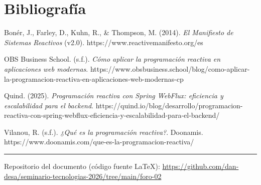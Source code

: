 \documentclass[
  spanish,
  12pt,
  letterpaper,
]{article}
\begin{document}
\section{Bibliografía}\label{bibliografuxeda}

Bonér, J., Farley, D., Kuhn, R., \& Thompson, M. (2014). \emph{El
Manifiesto de Sistemas Reactivos} (v2.0).
https://www.reactivemanifesto.org/es

OBS Business School. (s.f.). \emph{Cómo aplicar la programación reactiva
en aplicaciones web modernas}.
https://www.obsbusiness.school/blog/como-aplicar-la-programacion-reactiva-en-aplicaciones-web-modernas-cp

Quind. (2025). \emph{Programación reactiva con Spring WebFlux:
eficiencia y escalabilidad para el backend}.
https://quind.io/blog/desarrollo/programacion-reactiva-con-spring-webflux-eficiencia-y-escalabilidad-para-el-backend/

Vilanou, R. (s.f.). \emph{¿Qué es la programación reactiva?}. Doonamis.
https://www.doonamis.com/que-es-la-programacion-reactiva/

\begin{center}\rule{0.5\linewidth}{0.5pt}\end{center}

Repositorio del documento (código fuente LaTeX):
\url{https://github.com/dan-desa/seminario-tecnologias-2026/tree/main/foro-02}
\end{document}

